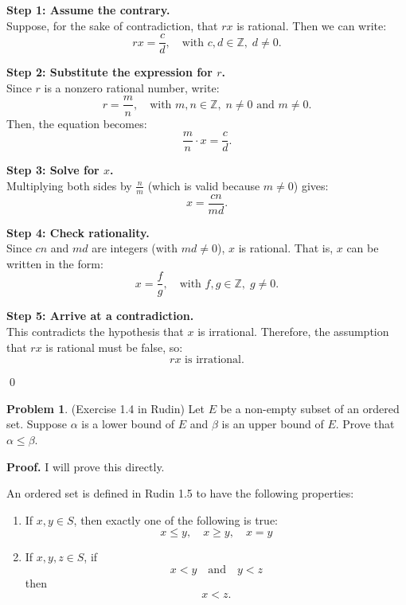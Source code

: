 \documentclass[12pt,oneside]{article}
\theoremstyle{definition}
\newtheorem{problem}{Problem}
\begin{document}
\textbf{Step 1: Assume the contrary.}\\
Suppose, for the sake of contradiction, that \( r x \) is rational. Then we can write:
\[
r x = \frac{c}{d}, \quad \text{with } c, d \in \mathbb{Z}, \; d \neq 0.
\]

\textbf{Step 2: Substitute the expression for \( r \).}\\
Since \( r \) is a nonzero rational number, write:
\[
r = \frac{m}{n}, \quad \text{with } m, n \in \mathbb{Z}, \; n \neq 0 \text{ and } m \neq 0.
\]
Then, the equation becomes:
\[
\frac{m}{n} \cdot x = \frac{c}{d}.
\]

\textbf{Step 3: Solve for \( x \).}\\
Multiplying both sides by \( \frac{n}{m} \) (which is valid because \( m \neq 0 \)) gives:
\[
x = \frac{c n}{m d}.
\]

\textbf{Step 4: Check rationality.}\\
Since \( c n \) and \( m d \) are integers (with \( m d \neq 0 \)), \( x \) is rational. That is, \( x \) can be written in the form:
\[
x = \frac{f}{g}, \quad \text{with } f, g \in \mathbb{Z}, \; g \neq 0.
\]

\textbf{Step 5: Arrive at a contradiction.}\\
This contradicts the hypothesis that \( x \) is irrational. Therefore, the assumption that \( r x \) is rational must be false, so:
\[
r x \text{ is irrational.}
\]

\qed

\newpage

\begin{problem}
(Exercise 1.4 in Rudin) 
Let $E$ be a non-empty subset of an ordered set. 
Suppose $\alpha$ is a lower bound of $E$ and $\beta$ is an upper bound of $E$. 
Prove that $\alpha \leq \beta$. 
\end{problem}

\textbf{Proof.} I will prove this directly.

An ordered set is defined in Rudin 1.5 to have the following properties:

\begin{enumerate}
    \item If \( x, y \in S \), then exactly one of the following is true:
    \[
    x \leq y, \quad x \geq y, \quad x = y
    \]

    \item If \( x, y, z \in S \), if
    \[
    x < y \quad \text{and} \quad y < z
    \]
    then
    \[
    x < z.
    \]
\end{enumerate}
\end{document}
